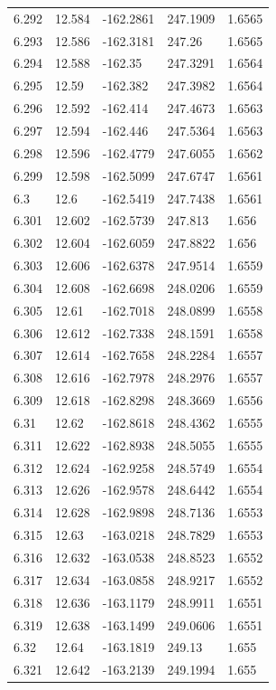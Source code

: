 \begin{tabular}{lllll}
6.292 & 12.584 & -162.2861 & 247.1909 & 1.6565 \\
6.293 & 12.586 & -162.3181 & 247.26 & 1.6565 \\
6.294 & 12.588 & -162.35 & 247.3291 & 1.6564 \\
6.295 & 12.59 & -162.382 & 247.3982 & 1.6564 \\
6.296 & 12.592 & -162.414 & 247.4673 & 1.6563 \\
6.297 & 12.594 & -162.446 & 247.5364 & 1.6563 \\
6.298 & 12.596 & -162.4779 & 247.6055 & 1.6562 \\
6.299 & 12.598 & -162.5099 & 247.6747 & 1.6561 \\
6.3 & 12.6 & -162.5419 & 247.7438 & 1.6561 \\
6.301 & 12.602 & -162.5739 & 247.813 & 1.656 \\
6.302 & 12.604 & -162.6059 & 247.8822 & 1.656 \\
6.303 & 12.606 & -162.6378 & 247.9514 & 1.6559 \\
6.304 & 12.608 & -162.6698 & 248.0206 & 1.6559 \\
6.305 & 12.61 & -162.7018 & 248.0899 & 1.6558 \\
6.306 & 12.612 & -162.7338 & 248.1591 & 1.6558 \\
6.307 & 12.614 & -162.7658 & 248.2284 & 1.6557 \\
6.308 & 12.616 & -162.7978 & 248.2976 & 1.6557 \\
6.309 & 12.618 & -162.8298 & 248.3669 & 1.6556 \\
6.31 & 12.62 & -162.8618 & 248.4362 & 1.6555 \\
6.311 & 12.622 & -162.8938 & 248.5055 & 1.6555 \\
6.312 & 12.624 & -162.9258 & 248.5749 & 1.6554 \\
6.313 & 12.626 & -162.9578 & 248.6442 & 1.6554 \\
6.314 & 12.628 & -162.9898 & 248.7136 & 1.6553 \\
6.315 & 12.63 & -163.0218 & 248.7829 & 1.6553 \\
6.316 & 12.632 & -163.0538 & 248.8523 & 1.6552 \\
6.317 & 12.634 & -163.0858 & 248.9217 & 1.6552 \\
6.318 & 12.636 & -163.1179 & 248.9911 & 1.6551 \\
6.319 & 12.638 & -163.1499 & 249.0606 & 1.6551 \\
6.32 & 12.64 & -163.1819 & 249.13 & 1.655 \\
6.321 & 12.642 & -163.2139 & 249.1994 & 1.655 \\

\end{tabular}
